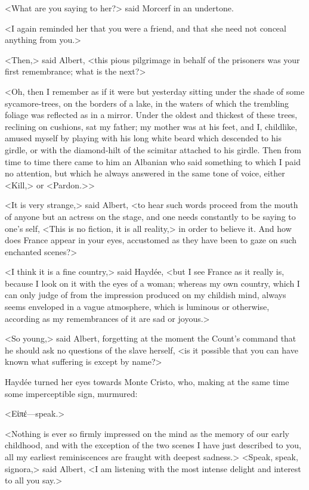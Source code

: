  <What are you saying to her?> said Morcerf in an undertone. 

 <I again reminded her that you were a friend, and that she need not conceal anything from you.> 

 <Then,> said Albert, <this pious pilgrimage in behalf of the prisoners was your first remembrance; what is the next?> 

 <Oh, then I remember as if it were but yesterday sitting under the shade of some sycamore-trees, on the borders of a lake, in the waters of which the trembling foliage was reflected as in a mirror. Under the oldest and thickest of these trees, reclining on cushions, sat my father; my mother was at his feet, and I, childlike, amused myself by playing with his long white beard which descended to his girdle, or with the diamond-hilt of the scimitar attached to his girdle. Then from time to time there came to him an Albanian who said something to which I paid no attention, but which he always answered in the same tone of voice, either <Kill,> or <Pardon.>> 

 <It is very strange,> said Albert, <to hear such words proceed from the mouth of anyone but an actress on the stage, and one needs constantly to be saying to one's self, <This is no fiction, it is all reality,> in order to believe it. And how does France appear in your eyes, accustomed as they have been to gaze on such enchanted scenes?> 

 <I think it is a fine country,> said Haydée, <but I see France as it really is, because I look on it with the eyes of a woman; whereas my own country, which I can only judge of from the impression produced on my childish mind, always seems enveloped in a vague atmosphere, which is luminous or otherwise, according as my remembrances of it are sad or joyous.> 

 <So young,> said Albert, forgetting at the moment the Count's command that he should ask no questions of the slave herself, <is it possible that you can have known what suffering is except by name?> 

 Haydée turned her eyes towards Monte Cristo, who, making at the same time some imperceptible sign, murmured: 

 <Εἰπέ—speak.> 

 <Nothing is ever so firmly impressed on the mind as the memory of our early childhood, and with the exception of the two scenes I have just described to you, all my earliest reminiscences are fraught with deepest sadness.>  <Speak, speak, signora,> said Albert, <I am listening with the most intense delight and interest to all you say.> 

